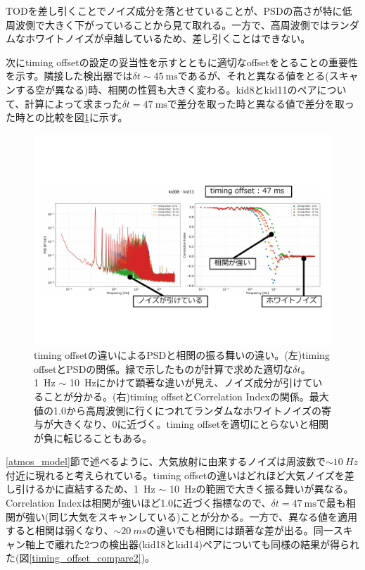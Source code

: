TODを差し引くことでノイズ成分を落とせていることが、PSDの高さが特に低周波側で大きく下がっていることから見て取れる。一方で、高周波側ではランダムなホワイトノイズが卓越しているため、差し引くことはできない。

次にtiming offsetの設定の妥当性を示すとともに適切なoffsetをとることの重要性を示す。隣接した検出器では$\delta t\sim\SI{45}{\mathrm{ms}}$であるが、それと異なる値をとる(スキャンする空が異なる)時、相関の性質も大きく変わる。kid8とkid11のペアについて、計算によって求まった$\delta t=\SI{47}{\mathrm{ms}}$で差分を取った時と異なる値で差分を取った時との比較を図\ref{timing_offset_compare}に示す。
\begin{figure}[htbp]
  \centering
  \includegraphics[width=1.05\columnwidth]{5_alignment/figs/timing_offset_compare.pdf}
  \caption{timing offsetの違いによるPSDと相関の振る舞いの違い。(左)timing offsetとPSDの関係。緑で示したものが計算で求めた適切な$\delta t$。\SI{1}{Hz} $\sim$ \SI{10}{Hz}にかけて顕著な違いが見え、ノイズ成分が引けていることが分かる。(右)timing offsetとCorrelation Indexの関係。最大値の1.0から高周波側に行くにつれてランダムなホワイトノイズの寄与が大きくなり、0に近づく。timing offsetを適切にとらないと相関が負に転じることもある。}
  \label{timing_offset_compare}
\end{figure}
\ref{atmos_model}節で述べるように、大気放射に由来するノイズは周波数で$\sim\SI{10}{Hz}$付近に現れると考えられている。timing offsetの違いはどれほど大気ノイズを差し引けるかに直結するため、\SI{1}{Hz} $\sim$ \SI{10}{Hz}の範囲で大きく振る舞いが異なる。Correlation Indexは相関が強いほど1.0に近づく指標なので、$\delta t=\SI{47}{\mathrm{ms}}$で最も相関が強い(同じ大気をスキャンしている)ことが分かる。一方で、異なる値を適用すると相関は弱くなり、$\sim\SI{20}{ms}$の違いでも相関には顕著な差が出る。同一スキャン軸上で離れた2つの検出器(kid18とkid14)ペアについても同様の結果が得られた(図\ref{timing_offset_compare2})。
